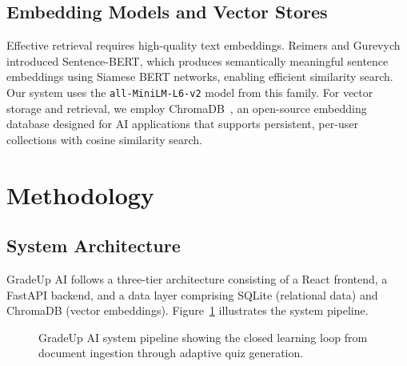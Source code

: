 \documentclass[runningheads]{llncs}
\begin{document}
\subsection{Embedding Models and Vector Stores}

Effective retrieval requires high-quality text embeddings. Reimers and Gurevych~\cite{reimers2019sentencebert} introduced Sentence-BERT, which produces semantically meaningful sentence embeddings using Siamese BERT networks, enabling efficient similarity search. Our system uses the \texttt{all-MiniLM-L6-v2} model from this family. For vector storage and retrieval, we employ ChromaDB~\cite{johnson2023chromadb}, an open-source embedding database designed for AI applications that supports persistent, per-user collections with cosine similarity search.

\section{Methodology}

\subsection{System Architecture}

GradeUp AI follows a three-tier architecture consisting of a React frontend, a FastAPI backend, and a data layer comprising SQLite (relational data) and ChromaDB (vector embeddings). Figure~\ref{fig:architecture} illustrates the system pipeline.

\begin{figure}[H]
\centering
{}
\caption{GradeUp AI system pipeline showing the closed learning loop from document ingestion through adaptive quiz generation.}
\label{fig:architecture}
\end{figure}
\end{document}
